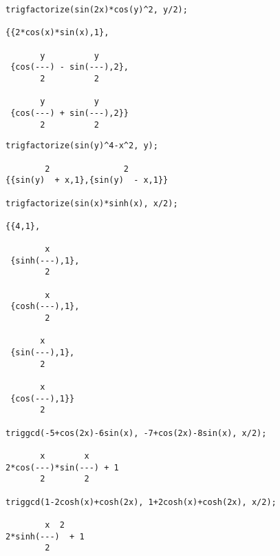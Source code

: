 \begin{verbatim}
trigfactorize(sin(2x)*cos(y)^2, y/2);

{{2*cos(x)*sin(x),1},

       y          y
 {cos(---) - sin(---),2},
       2          2

       y          y
 {cos(---) + sin(---),2}}
       2          2
\end{verbatim}
\begin{verbatim}
trigfactorize(sin(y)^4-x^2, y);

        2               2
{{sin(y)  + x,1},{sin(y)  - x,1}}

trigfactorize(sin(x)*sinh(x), x/2);

{{4,1},

        x
 {sinh(---),1},
        2

        x
 {cosh(---),1},
        2

       x
 {sin(---),1},
       2

       x
 {cos(---),1}}
       2

triggcd(-5+cos(2x)-6sin(x), -7+cos(2x)-8sin(x), x/2);

       x        x
2*cos(---)*sin(---) + 1
       2        2

triggcd(1-2cosh(x)+cosh(2x), 1+2cosh(x)+cosh(2x), x/2);

        x  2
2*sinh(---)  + 1
        2
\end{verbatim}

